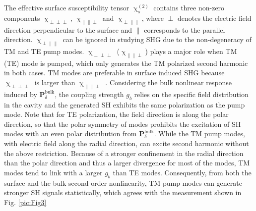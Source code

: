 \documentclass[a4paper,8pt,hyperref, twocolumn]{article}
\begin{document}
The effective surface susceptibility tensor $\upchi^{(2)}_s$ contains three non-zero components $\upchi_{\perp \perp \perp}$, $\upchi_{\parallel \parallel \perp}$ and $\upchi_{\perp \parallel \parallel}$, where $\perp$ denotes the electric field direction perpendicular to the surface and $\parallel$ corresponds to the parallel direction. 
$\upchi_{\perp \parallel \parallel}$ can be ignored in studying SHG due to the non-degeneracy of TM and TE pump modes.  
$\upchi_{\perp \perp \perp}$ ($\upchi_{\parallel \parallel \perp}$) plays a major role when TM (TE) mode is pumped, which only generates the TM polarized second harmonic in both cases. 
TM modes are preferable in surface induced SHG because $\upchi_{\perp \perp \perp}$ is larger than $\upchi_{\parallel \parallel \perp}$ \cite{rodriguez2008calibration}. 
Considering the bulk nonlinear response induced by $\mathbf{P}^{\mathrm{bulk}}_\delta$, the coupling strength $g_b$ relies on the specific field distribution in the cavity and the generated SH exhibits the same polarization as the pump mode. 
Note that for TE polarization, the field direction is along the polar direction, so that the polar symmetry of modes prohibits the excitation of SH modes with an even polar distribution from $\mathbf{P}^{\mathrm{bulk}}_\delta$. 
While the TM pump modes, with electric field along the radial direction, can excite second harmonic without the above restriction.
Because of a stronger confinement in the radial direction than the polar direction and thus a larger divergence for most of the modes, TM modes tend to link with a larger $g_b$ than TE modes. 
Consequently, from both the surface and the bulk second order nonlinearity, TM pump modes can generate stronger SH signals statistically, which agrees with the measurement shown in Fig. \ref{pic:Fig3}
\end{document}
